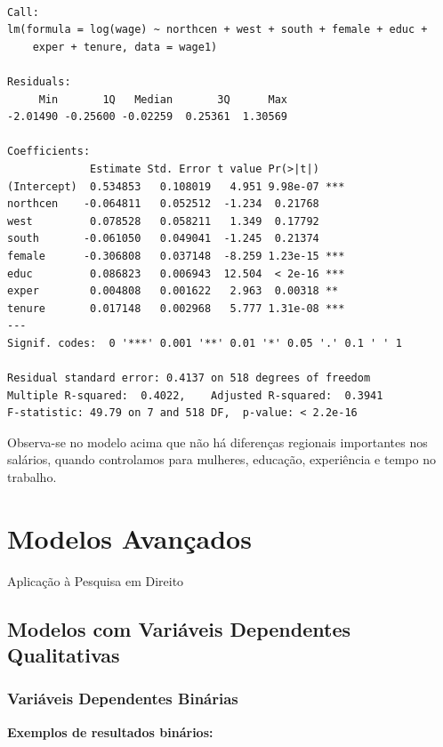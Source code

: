\documentclass[
  letterpaper,
  DIV=11,
  numbers=noendperiod]{scrreprt}
\begin{document}
\begin{verbatim}

Call:
lm(formula = log(wage) ~ northcen + west + south + female + educ + 
    exper + tenure, data = wage1)

Residuals:
     Min       1Q   Median       3Q      Max 
-2.01490 -0.25600 -0.02259  0.25361  1.30569 

Coefficients:
             Estimate Std. Error t value Pr(>|t|)    
(Intercept)  0.534853   0.108019   4.951 9.98e-07 ***
northcen    -0.064811   0.052512  -1.234  0.21768    
west         0.078528   0.058211   1.349  0.17792    
south       -0.061050   0.049041  -1.245  0.21374    
female      -0.306808   0.037148  -8.259 1.23e-15 ***
educ         0.086823   0.006943  12.504  < 2e-16 ***
exper        0.004808   0.001622   2.963  0.00318 ** 
tenure       0.017148   0.002968   5.777 1.31e-08 ***
---
Signif. codes:  0 '***' 0.001 '**' 0.01 '*' 0.05 '.' 0.1 ' ' 1

Residual standard error: 0.4137 on 518 degrees of freedom
Multiple R-squared:  0.4022,    Adjusted R-squared:  0.3941 
F-statistic: 49.79 on 7 and 518 DF,  p-value: < 2.2e-16
\end{verbatim}

Observa-se no modelo acima que não há diferenças regionais importantes
nos salários, quando controlamos para mulheres, educação, experiência e
tempo no trabalho.


\chapter{Modelos Avançados}\label{modelos-avanuxe7ados}

Aplicação à Pesquisa em Direito

\hfill\break

\section{Modelos com Variáveis Dependentes
Qualitativas}\label{modelos-com-variuxe1veis-dependentes-qualitativas}

\subsection{Variáveis Dependentes
Binárias}\label{variuxe1veis-dependentes-binuxe1rias}

\textbf{Exemplos de resultados binários:}
\end{document}

